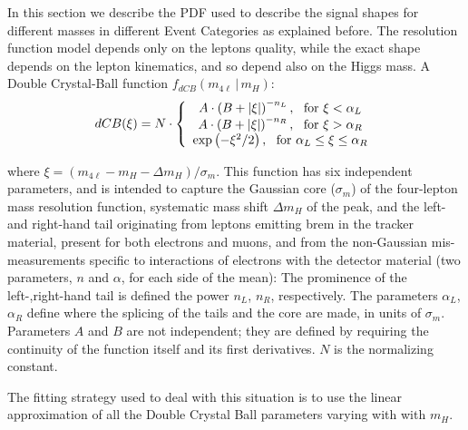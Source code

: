 In this section we describe the PDF used to describe the signal shapes 
for different masses  in different Event Categories as explained before. 
The resolution function model depends only on the leptons quality, while the exact 
shape depends on the lepton kinematics, and so depend also on the Higgs mass. A Double
Crystal-Ball function $f_{dCB}(m_{4\ell} \, | \, m_{H})$:
%
\begin{equation}
dCB(\xi ) = N \cdot \left\{ {\begin{array}{*{20}c}
   { A \cdot \left( B  + |\xi | \right)^{- n_L } ,  {\rm{      \,\,\,\,   for \,\, }} \xi  < \alpha_L }  \\
   { A \cdot \left( B  + |\xi | \right)^{- n_R } ,  {\rm{      \,\,\,\,   for \,\, }} \xi  > \alpha_R }  \\
   {\exp \left( - \xi ^2  / 2 \right) ,            {\rm{      \,\,\,\,   for  \,\, }} \alpha_L \leq \xi  \leq \alpha_R }  \\
\end{array}} \right.
\label{eq:dCB}
\end{equation}
%
 
where $ \xi = ( m_{4\ell} - m_{H} - \Delta m_{H} ) /\sigma_m$.
This function has six independent parameters, and is intended to
capture the Gaussian core ($\sigma_m$) of the four-lepton mass
resolution function, systematic mass shift $\Delta m_{H}$ of the
peak, and the left- and right-hand tail originating from leptons
emitting brem in the tracker material, present for both electrons and
muons, and from the non-Gaussian mis-measurements specific to
interactions of electrons with the detector material (two parameters,
$n$ and $\alpha$, for each side of the mean): The prominence of the
left-,right-hand tail is defined the power $n_L$, $n_R$, respectively.
The parameters $\alpha_L$, $\alpha_R$ define where the splicing of the
tails and the core are made, in units of $\sigma_m$. Parameters $A$ and $B$ are not
independent; they are defined by requiring the continuity of the
function itself and its first derivatives.  $N$ is the normalizing
constant.

The fitting strategy used to deal with this situation is to use the linear approximation
of all the Double Crystal Ball parameters varying with  with $m_{H}$.

